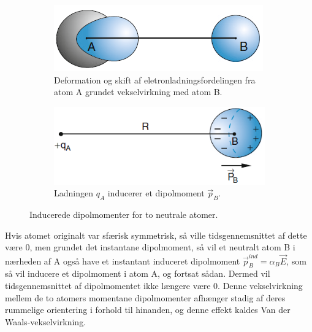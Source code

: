 \begin{figure}[!h]
    \centering
    \begin{subfigure}[t]{0.45\textwidth}
        \centering
        \includegraphics[width=\columnwidth]{Q19/images/ChargeDistributionShift.PNG}
        \caption{Deformation og skift af eletronladningsfordelingen fra atom A grundet vekselvirkning med atom B.}
        \label{fig:Q19_ChargeDistributionShift}
    \end{subfigure}
    \hfill
    \begin{subfigure}[t]{0.45\textwidth}
        \centering
        \includegraphics[width=\columnwidth]{Q19/images/InducedDipoleMoment.PNG}
        \caption{Ladningen $q_A$ inducerer et dipolmoment $\Vec{p}_B$.}
        \label{fig:Q19_InducedDipoleMoment}
    \end{subfigure}
    \caption{Inducerede dipolmomenter for to neutrale atomer.}
    \label{fig:Q_19}
\end{figure}

Hvis atomet originalt var sfærisk symmetrisk, så ville tidsgennemsnittet af dette være 0, men grundet det instantane dipolmoment, så vil et neutralt atom B i nærheden af A også have et instantant induceret dipolmoment $\Vec{p}_B^{ind} = \alpha_B \Vec{E}$, som så vil inducere et dipolmoment i atom A, og fortsat sådan. Dermed vil tidsgennemsnittet af dipolmomentet ikke længere være 0. Denne vekselvirkning mellem de to atomers momentane dipolmomenter afhænger stadig af deres rummelige orientering i forhold til hinanden, og denne effekt kaldes Van der Waals-vekselvirkning.

